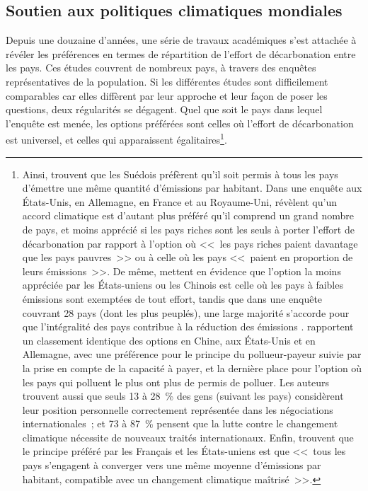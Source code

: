 \documentclass[a5paper,french]{memoir}
\begin{document}
\subsection{Soutien aux politiques climatiques mondiales}

Depuis une douzaine d'années, une série de travaux académiques s'est attachée à révéler les préférences en termes de répartition de l'effort de décarbonation entre les pays. Ces études couvrent de nombreux pays, à travers des enquêtes représentatives de la population. Si les différentes études sont difficilement comparables car elles diffèrent par leur approche et leur façon de poser les questions, deux régularités se dégagent. Quel que soit le pays dans lequel l'enquête est menée, les options préférées sont celles où l'effort de décarbonation est universel, et celles qui apparaissent égalitaires\footnote{Ainsi, \citet{carlsson_is_2011} trouvent que les Suédois préfèrent qu'il soit permis à tous les pays d'émettre une même quantité d'émissions par habitant. Dans une enquête aux États-Unis, en Allemagne, en France et au Royaume-Uni, \citet{bechtel_mass_2013} révèlent qu'un accord climatique est d'autant plus préféré qu'il comprend un grand nombre de pays, %
et moins apprécié si les pays riches sont les seuls à porter l'effort de décarbonation par rapport à l'option où <<~les pays riches paient davantage que les pays pauvres~>> ou à celle où les pays <<~paient en proportion de leurs émissions~>>. De même, \citet{carlsson_fair_2013} mettent en évidence que l'option la moins appréciée par les États-uniens ou les Chinois est celle où les pays à faibles émissions sont exemptées de tout effort, tandis que dans une enquête couvrant 28 pays (dont les plus peuplés), une large majorité s'accorde pour que l'intégralité des pays contribue à la réduction des émissions \citep{dabla-norris_public_2023}. 
\citet{schleich_citizens_2016} rapportent un classement identique des options en Chine, aux États-Unis et en Allemagne, avec une préférence pour le principe du pollueur-payeur suivie par la prise en compte de la capacité à payer, et la dernière place pour l'option où les pays qui polluent le plus ont plus de permis de polluer. Les auteurs trouvent aussi que seuls 13 à 28~\% des gens (suivant les pays) considèrent leur position personnelle correctement représentée dans les négociations internationales~; et 73 à 87~\% pensent que la lutte contre le changement climatique nécessite de nouveaux traités internationaux. Enfin, \citet{meilland_international_2023} trouvent que le principe préféré par les Français et les États-uniens est que <<~tous les pays s'engagent à converger vers une même moyenne d'émissions par habitant, compatible avec un changement climatique maîtrisé~>>.}. %
\end{document}
